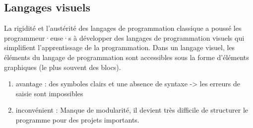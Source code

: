 \documentclass[11pt, a4paper]{book}
\begin{document}
\subsection{Langages visuels}		
La rigidité et l'austérité des langages de programmation classique a poussé les programmeur·euse·s à développer des langages de programmation visuels qui simplifient l'apprentissage de la programmation. Dans un langage visuel, les éléments du langage de programmation sont accessibles sous la forme d’éléments graphiques (le plus souvent des blocs).
\begin{enumerate}
	\item{avantage :} des symboles clairs et une absence  de syntaxe ->  les erreurs de saisie sont impossibles
	\item{inconvénient :} Manque de modularité, il devient très difficile de structurer le programme pour des projets importants.
\end{enumerate}
\end{document}

